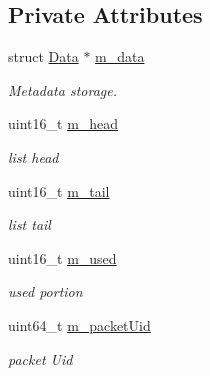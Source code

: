 \subsection*{Private Attributes}
\begin{DoxyCompactItemize}
\item 
struct \hyperlink{structns3_1_1PacketMetadata_1_1Data}{Data} $\ast$ \hyperlink{classns3_1_1PacketMetadata_a6a7206086aec2a73a094fe072650b9ee}{m\+\_\+data}
\begin{DoxyCompactList}\small\item\em Metadata storage. \end{DoxyCompactList}\item 
uint16\+\_\+t \hyperlink{classns3_1_1PacketMetadata_a46b3ef0a9a80a798ad1e81b5694a5658}{m\+\_\+head}
\begin{DoxyCompactList}\small\item\em list head \end{DoxyCompactList}\item 
uint16\+\_\+t \hyperlink{classns3_1_1PacketMetadata_ad24a659e236af7b98c475c97c4f60db9}{m\+\_\+tail}
\begin{DoxyCompactList}\small\item\em list tail \end{DoxyCompactList}\item 
uint16\+\_\+t \hyperlink{classns3_1_1PacketMetadata_afeecb22fe6f3368f3c56bda755892df9}{m\+\_\+used}
\begin{DoxyCompactList}\small\item\em used portion \end{DoxyCompactList}\item 
uint64\+\_\+t \hyperlink{classns3_1_1PacketMetadata_ad97fbc08482c155bc4c11fdff820be86}{m\+\_\+packet\+Uid}
\begin{DoxyCompactList}\small\item\em packet Uid \end{DoxyCompactList}\end{DoxyCompactItemize}

